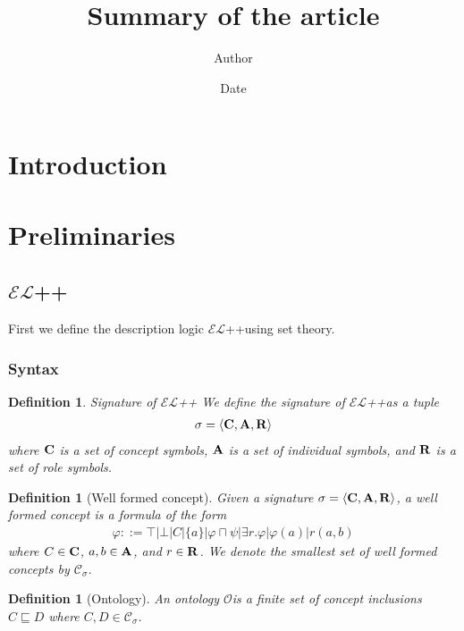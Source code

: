 \documentclass[12pt]{article}
\newtheorem{definition}[theorem]{Definition}
\newcommand{\ELt}{$\mathcal{EL}$++}
\newcommand{\concepts}{{\bf C}}
\newcommand{\individuals}{{\bf A}}
\newcommand{\roles}{{\bf R}}
\newcommand{\tuple}[1]{\langle #1 \rangle}
\newcommand{\ontologyt}{$\mathcal{O}$}
\begin{document}
\title{Summary of the article}
\author{Author}
\date{Date}
\maketitle

\section{Introduction}
\label{sec:intro}


\section{Preliminaries}
\label{sec:prelim}
\subsection{\ELt}
First we define the description logic \ELt using
set theory.
\subsubsection{Syntax}
\begin{definition}{Signature of \ELt}
    We define the signature of \ELt as a tuple
    \begin{align*}
        \sigma = \tuple{\concepts, \individuals, \roles}
    \end{align*}
    where $\concepts$ is a set of concept symbols, $\individuals$ is a set of
    individual symbols, and $\roles$ is a set of role symbols.
\end{definition}
\begin{definition}[Well formed concept]
    Given a signature $\sigma=\tuple{\concepts, \individuals, \roles}$, a
    well formed concept is a formula of the form
    \begin{align*}
        \varphi ::= \top | \bot | C | \{a\} | \varphi \sqcap \psi | 
        \exists r.\varphi | \varphi(a) | r(a,b)
    \end{align*}
    where $C \in \concepts$, 
    $a,b \in \individuals$, and $r \in \roles$.
    We denote the smallest 
    set of well formed concepts by $\mathcal{C}_\sigma$.
\end{definition}
\begin{definition}[Ontology]
    An ontology \ontologyt is a finite set
    of concept inclusions $C\sqsubseteq D$
    where $C,D \in \mathcal{C}_\sigma$. 
\end{definition}
\end{document}

